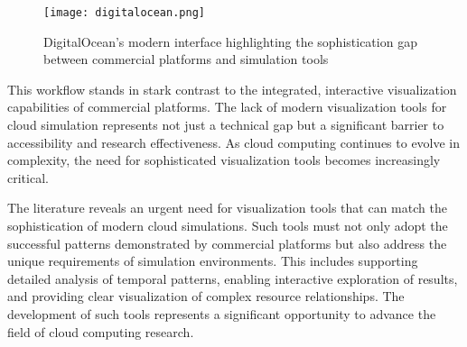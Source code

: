 \begin{figure}[h]
\texttt{[image: digitalocean.png]}
\caption{DigitalOcean's modern interface highlighting the sophistication gap between commercial platforms and simulation tools}
\label{fig:digitalocean}
\end{figure}

This workflow stands in stark contrast to the integrated, interactive visualization capabilities of commercial platforms. The lack of modern visualization tools for cloud simulation represents not just a technical gap but a significant barrier to accessibility and research effectiveness. As cloud computing continues to evolve in complexity, the need for sophisticated visualization tools becomes increasingly critical.


The literature reveals an urgent need for visualization tools that can match the sophistication of modern cloud simulations. Such tools must not only adopt the successful patterns demonstrated by commercial platforms but also address the unique requirements of simulation environments. This includes supporting detailed analysis of temporal patterns, enabling interactive exploration of results, and providing clear visualization of complex resource relationships. The development of such tools represents a significant opportunity to advance the field of cloud computing research.